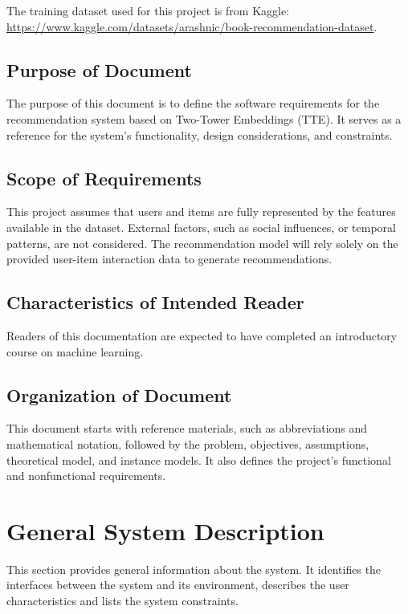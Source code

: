 \documentclass[12pt]{article}
\begin{document}
The training dataset used for this project is from Kaggle: \url{https://www.kaggle.com/datasets/arashnic/book-recommendation-dataset}.

\subsection{Purpose of Document}

The purpose of this document is to define the software requirements for the recommendation system based on Two-Tower Embeddings (TTE). It serves as a reference for the system’s functionality, design considerations, and constraints.

\subsection{Scope of Requirements} 

This project assumes that users and items are fully represented by the features available in the dataset. External factors, such as social influences, or temporal patterns, are not considered. The recommendation model will rely solely on the provided user-item interaction data to generate recommendations.

\subsection{Characteristics of Intended Reader} \label{sec_IntendedReader}
Readers of this documentation are expected to have completed an introductory course on machine learning.

\subsection{Organization of Document}

This document starts with reference materials, such as abbreviations and mathematical notation, followed by the problem, objectives, assumptions, theoretical model, and instance models. It also defines the project's functional and nonfunctional requirements.

\section{General System Description}

This section provides general information about the system.  It identifies the
interfaces between the system and its environment, describes the user
characteristics and lists the system constraints. 
\end{document}
